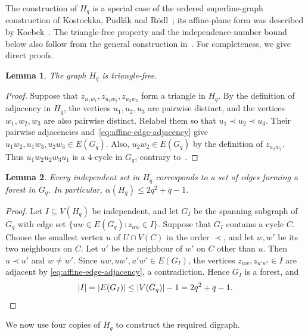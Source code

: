\documentclass[11pt,a4paper]{article}
\newtheorem{lemma}[lemma]{Lemma}
\theoremstyle{remark}
\numberwithin{equation}{section}
\begin{document}
The construction of $H_q$ is a special case of the ordered superline-graph construction of Kostochka, Pudl\'ak and R\"odl~\cite{KPR}; its affine-plane form was described by Kocbek~\cite{Kocbek}.
The triangle-free property and the independence-number bound below also follow from the general construction in~\cite{KPR}.
For completeness, we give direct proofs.

\begin{lemma}\label{lem:affine-triangle-free}
	The graph $H_q$ is triangle-free.
\end{lemma}

\begin{proof}
	Suppose that $z_{u_1w_1},z_{u_2w_2},z_{u_3w_3}$ form a triangle
	in $H_q$.
	By the definition of adjacency in $H_q$, the vertices $u_1,u_2,u_3$
	are pairwise distinct, and the vertices $w_1,w_2,w_3$ are also
	pairwise distinct.
	Relabel them so that $u_1\prec u_2\prec u_3$.
	Their pairwise adjacencies and~\eqref{eq:affine-edge-adjacency}
	give $u_1w_2,u_1w_3,u_2w_3\in E(G_q)$.
	Also, $u_2w_2\in E(G_q)$ by the definition of $z_{u_2w_2}$.
	Thus $u_1w_2u_2w_3u_1$ is a $4$-cycle in $G_q$, contrary
	to~.
\end{proof}

\begin{lemma}\label{lem:affine-independence}
	Every independent set in $H_q$ corresponds to a set of edges
	forming a forest in $G_q$.
	In particular, $\alpha(H_q)\le2q^2+q-1$.
\end{lemma}

\begin{proof}
	Let $I\subseteq V(H_q)$ be independent, and let $G_I$ be the
	spanning subgraph of $G_q$ with edge set
	$\{uw\in E(G_q):z_{uw}\in I\}$.
	Suppose that $G_I$ contains a cycle $C$.
	Choose the smallest vertex $u$ of $U\cap V(C)$ in the order
	$\prec$, and let $w,w'$ be its two neighbours on $C$.
	Let $u'$ be the neighbour of $w'$ on $C$ other than $u$.
	Then $u\prec u'$ and $w\ne w'$.
	Since $uw,uw',u'w'\in E(G_I)$, the vertices
	$z_{uw},z_{u'w'}\in I$ are adjacent by
	\eqref{eq:affine-edge-adjacency}, a contradiction.
	Hence $G_I$ is a forest, and
	\[
	|I|=|E(G_I)|\le |V(G_q)|-1=2q^2+q-1.\qedhere
	\]
\end{proof}

We now use four copies of $H_q$ to construct the required digraph.
\end{document}
